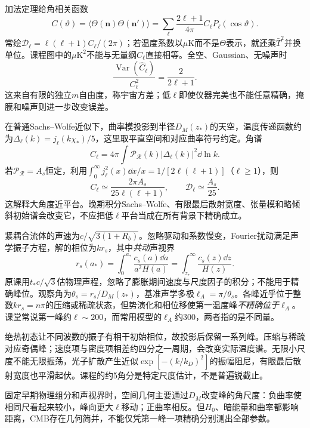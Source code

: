 加法定理给角相关函数
\[
 C(\vartheta)=\langle\Theta(\mathbf n)\Theta(\mathbf n')\rangle
 =\sum_\ell\frac{2\ell+1}{4\pi}C_\ell P_\ell(\cos\vartheta).
\]
常绘$\mathcal D_\ell=\ell(\ell+1)C_\ell/(2\pi)$；若温度系数以$\mu\mathrm K$而不是$\Theta$表示，就还乘$\bar T^2$并换单位。课程图中的$\mu\mathrm K^2$不能与无量纲$C_\ell$直接相等。全空、Gaussian、无噪声时
\[
 \frac{\operatorname{Var}(\widehat C_\ell)}{C_\ell^2}=\frac{2}{2\ell+1}.
\]
这来自有限的独立$m$自由度，称宇宙方差；低$\ell$即使仪器完美也不能任意精确，掩膜和噪声则进一步改变误差。

在普通Sachs--Wolfe近似下，曲率模投影到半径$D_M(z_*)$的天空，温度传递函数约为$\Delta_\ell(k)=j_\ell(k\chi_*)/5$，这里取平直空间和对应曲率符号约定。角谱
\[
 C_\ell=4\pi\int\mathcal P_{\mathcal R}(k)|\Delta_\ell(k)|^2\dd\ln k.
\]
若$\mathcal P_{\mathcal R}=A_s$恒定，利用$\int_0^\infty j_\ell^2(x)\dd x/x=1/[2\ell(\ell+1)]$（$\ell\ge1$），则
\[
 C_\ell\simeq\frac{2\pi A_s}{25\ell(\ell+1)},\qquad \mathcal D_\ell\simeq\frac{A_s}{25}.
\]
这解释大角度近平台。晚期积分Sachs--Wolfe、有限最后散射宽度、张量模和略倾斜初始谱会改变它，不应把低$\ell$平台当成在所有背景下精确成立。

紧耦合流体的声速为$c/\sqrt{3(1+R_b)}$。忽略驱动和系数慢变，Fourier扰动满足声学振子方程，解的相位为$kr_s$，其中\emph{共动}声视界
\begin{equation}\label{eq:astro-sound-horizon}
 r_s(a_*)=\int_0^{a_*}\frac{c_s(a)\dd a}{a^2H(a)}
 =\int_{z_*}^{\infty}\frac{c_s(z)\dd z}{H(z)}.
\end{equation}
原课用$t_*c/\sqrt3$估物理声程，忽略了膨胀期间速度与尺度因子的积分；不能用于精确峰位。观察角为$\theta_s=r_s/D_M(z_*)$，基准声学多极$\ell_A=\pi/\theta_s$。各峰近乎位于整数$kr_s=n\pi$的压缩或稀疏状态，但势演化和相位移使第一温度峰\emph{不精确位于}$\ell_A$。课堂常说第一峰约$\ell\sim200$，而常用模型的$\ell_A$约300，两者指的是不同量。

绝热初态让不同波数的振子有相干初始相位，故投影后保留一系列峰。压缩与稀疏对应奇偶峰；速度项与密度项相差约四分之一周期，会改变实际温度谱。无限小尺度不能无限振荡，光子扩散产生近似$\exp[-(k/k_D)^2]$的振幅阻尼，有限最后散射宽度也平滑起伏。课程的约5角分是特定尺度估计，不是普遍锐截止。

固定早期物理组分和声视界时，空间几何主要通过$D_M$改变峰的角尺度：负曲率使相同尺看起来较小，峰向更大$\ell$移动；正曲率相反。但$H_0$、暗能量和曲率都影响距离，CMB存在几何简并，不能仅凭第一峰一项精确分别测出全部参数。

